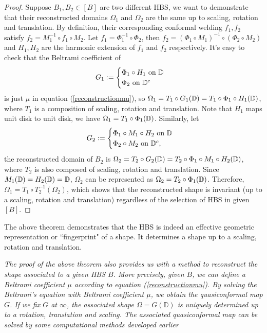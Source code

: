 \documentclass[review,onefignum,onetabnum]{siamonline190516}
\begin{document}
\begin{proof}
Suppose $B_1, B_2 \in [B]$ are two different HBS, we want to demonstrate that their reconstructed domains $\Omega_1$ and $\Omega_2$ are the same up to scaling, rotation and translation. By definition, their corresponding conformal welding $f_1, f_2$ satisfy $f_2 = M_1^{-1} \circ f_1 \circ M_2$. Let $f_1 = \Phi_1^{-1} \circ \Phi_2$, then $f_2 = (\Phi_1 \circ M_1)^{-1} \circ (\Phi_2 \circ M_2)$ and $H_1, H_2$ are the harmonic extension of $f_1$ and $f_2$ respectively. It's easy to check that the Beltrami coefficient of 
\begin{equation} 
    G_1 := \begin{cases}
    \Phi_1 \circ H_1 \text{ on } \mathbb{\mathbb{D}}\\
    \Phi_2 \text{ on } \mathbb{D}^c
    \end{cases}
\end{equation}
is just $\mu$ in equation (\ref{reconstructionmu}), so $\Omega_1 = T_1 \circ G_1(\mathbb{D}) = T_1 \circ \Phi_1 \circ H_1 (\mathbb{D})$, where $T_1$ is a composition of scaling, rotation and translation. Note that $H_1$ maps unit disk to unit disk, we have $\Omega_1 = T_1 \circ \Phi_1 (\mathbb{D})$.
Similarly, let
\begin{equation}
    G_2 := \begin{cases}
    \Phi_1 \circ M_1 \circ H_2 \text{ on } \mathbb{\mathbb{D}}\\
    \Phi_2 \circ M_2 \text{ on } \mathbb{D}^c,
    \end{cases}
\end{equation}
the reconstructed domain of $B_2$ is $\Omega_2 = T_2 \circ G_2(\mathbb{D}) = T_2 \circ \Phi_1 \circ M_1 \circ H_2(\mathbb{D})$, where $T_2$ is also composed of scaling, rotation and translation. Since $M_1(\mathbb{D}) = H_2(\mathbb{D}) = \mathbb{D}$, $\Omega_2$ can be represented as $\Omega_2 = T_2 \circ \Phi_1(\mathbb{D})$. Therefore, $\Omega_1= T_1 \circ T_2^{-1} (\Omega_2)$, which shows that the reconstructed shape is invariant (up to a scaling, rotation and translation) regardless of the selection of HBS in given $[B]$.
\end{proof}

The above theorem demonstrates that the HBS is indeed an effective geometric representation or ``fingerprint" of a shape. It determines a shape up to a scaling, rotation and translation. 

\bigskip

{\it The proof of the above theorem also provides us with a method to reconstruct the shape associated to a given HBS $B$. More precisely, given $B$, we can define a Beltrami coefficient $\mu$ according to equation (\ref{reconstructionmu}). By solving the Beltrami's equation with Beltrami coefficient $\mu$, we obtain the quasiconformal map $G$. If we fix $G$ at $\infty$, the associated shape $\Omega = G(\mathbb{D})$ is uniquely determined up to a rotation, translation and scaling. The associated quasiconformal map can be solved by some computational methods developed earlier \cite{lui2013texture,lui2012optimization,choi2020shape}}
\end{document}
